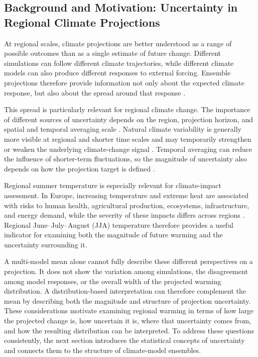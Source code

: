 \documentclass[
]{krantz}
\begin{document}
\subsection{Background and Motivation: Uncertainty in Regional Climate Projections}\label{background-and-motivation-uncertainty-in-regional-climate-projections}

At regional scales, climate projections are better understood as a range of possible outcomes than as a single estimate of future change. Different simulations can follow different climate trajectories, while different climate models can also produce different responses to external forcing. Ensemble projections therefore provide information not only about the expected climate response, but also about the spread around that response \citep{Tebaldi2007, Hawkins2009}.

This spread is particularly relevant for regional climate change. The importance of different sources of uncertainty depends on the region, projection horizon, and spatial and temporal averaging scale \citep{Hawkins2009}. Natural climate variability is generally more visible at regional and shorter time scales and may temporarily strengthen or weaken the underlying climate-change signal \citep{Deser2020, Gruber2026}. Temporal averaging can reduce the influence of shorter-term fluctuations, so the magnitude of uncertainty also depends on how the projection target is defined \citep{Hawkins2009}.

Regional summer temperature is especially relevant for climate-impact assessment. In Europe, increasing temperature and extreme heat are associated with risks to human health, agricultural production, ecosystems, infrastructure, and energy demand, while the severity of these impacts differs across regions \citep{BednarFriedl2022}. Regional June--July--August (JJA) temperature therefore provides a useful indicator for examining both the magnitude of future warming and the uncertainty surrounding it.

A multi-model mean alone cannot fully describe these different perspectives on a projection. It does not show the variation among simulations, the disagreement among model responses, or the overall width of the projected warming distribution. A distribution-based interpretation can therefore complement the mean by describing both the magnitude and structure of projection uncertainty. These considerations motivate examining regional warming in terms of how large the projected change is, how uncertain it is, where that uncertainty comes from, and how the resulting distribution can be interpreted. To address these questions consistently, the next section introduces the statistical concepts of uncertainty and connects them to the structure of climate-model ensembles.
\end{document}
